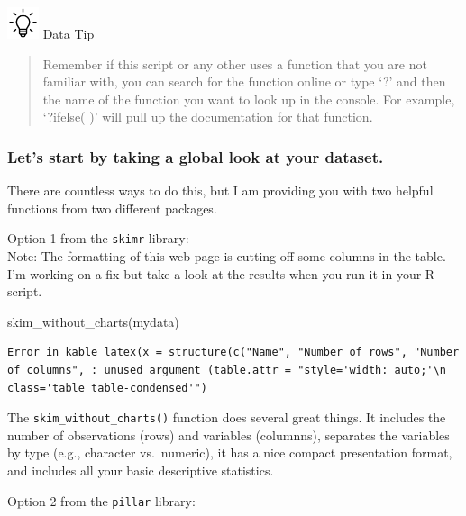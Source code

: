 \documentclass[
]{book}
\newenvironment{Shaded}{\begin{snugshade}}{\end{snugshade}}
\newcommand{\FunctionTok}[1]{\textcolor[rgb]{0.00,0.00,0.00}{#1}}
\newcommand{\NormalTok}[1]{#1}
\begin{document}
\includegraphics[width=0.36458in,height=\textheight]{images/bulb.png} Data Tip

\begin{quote}
Remember if this script or any other uses a function that you are not familiar with, you can search for the function online or type `?' and then the name of the function you want to look up in the console. For example, `?ifelse( )' will pull up the documentation for that function.
\end{quote}

\hypertarget{global}{%
\subsubsection*{Let's start by taking a global look at your dataset.}\label{global}}

There are countless ways to do this, but I am providing you with two helpful functions from two different packages.

Option 1 from the \texttt{skimr} library:\\
Note: The formatting of this web page is cutting off some columns in the table. I'm working on a fix but take a look at the results when you run it in your R script.

\begin{Shaded}
\begin{Highlighting}[]
\FunctionTok{skim\_without\_charts}\NormalTok{(mydata)}
\end{Highlighting}
\end{Shaded}

\begin{verbatim}
Error in kable_latex(x = structure(c("Name", "Number of rows", "Number of columns", : unused argument (table.attr = "style='width: auto;'\n        class='table table-condensed'")
\end{verbatim}

The \texttt{skim\_without\_charts()} function does several great things. It includes the number of observations (rows) and variables (columnns), separates the variables by type (e.g., character vs.~numeric), it has a nice compact presentation format, and includes all your basic descriptive statistics.

Option 2 from the \texttt{pillar} library:
\end{document}

